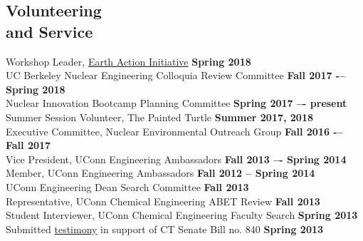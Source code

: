 \documentclass[margin,line]{resume}
\begin{document}
\begin{resume}

\section{\mysidestyle Volunteering\\and Service}

Workshop Leader, \href{https://www.earthactioninitiative.org/}{Earth Action Initiative}
    \hfill \textbf{Spring 2018} \\
UC Berkeley Nuclear Engineering Colloquia Review Committee 
    \hfill \textbf{Fall 2017 -– Spring 2018} \\
Nuclear Innovation Bootcamp Planning Committee	
    \hfill \textbf{Spring 2017 –- present} \\
Summer Session Volunteer, The Painted Turtle
    \hfill \textbf{Summer 2017, 2018} \\
Executive Committee, Nuclear Environmental Outreach Group
    \hfill \textbf{Fall 2016 -– Fall 2017} \\
Vice President, UConn Engineering Ambassadors
    \hfill \textbf{Fall 2013 –- Spring 2014} \\
Member, UConn Engineering Ambassadors
    \hfill \textbf{Fall 2012 – Spring 2014} \\
UConn Engineering Dean Search Committee
    \hfill \textbf{Fall 2013} \\
Representative, UConn Chemical Engineering ABET Review
    \hfill \textbf{Fall 2013} \\
Student Interviewer, UConn Chemical Engineering Faculty Search
    \hfill \textbf{Spring 2013} \\
Submitted \href{https://www.cga.ct.gov/2013/FINdata/Tmy/2013SB-00840-R000304-Milos\%20Atz,\%20Student,\%20UConn-TMY.PDF}{testimony} in support of CT Senate Bill no. 840
    \hfill \textbf{Spring 2013} \\ %




\end{resume}
\end{document}
